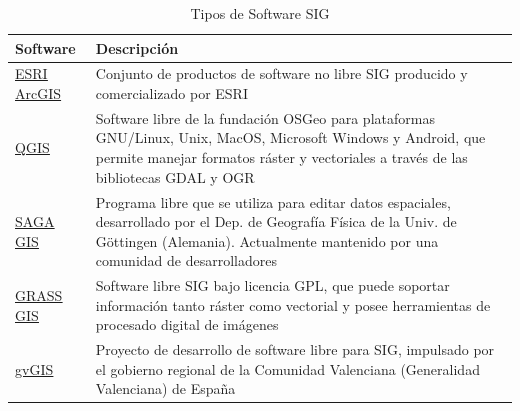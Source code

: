 \begin{table}[H]
	\centering
	\caption{Tipos de Software SIG}
	\label{softwaresSIG}
	\begin{tabular}[b]{|m{2.44cm}||m{8.69cm}|}
		\hline
		
		\cellcolor[HTML]{EFEFEF} \centering \textbf{Software} & \cellcolor[HTML]{EFEFEF} \textbf{Descripción} \\ \hline \hline
		
		
		\centering \href{https://www.arcgis.com/}{\underline{ESRI ArcGIS}} & Conjunto de productos de software no libre SIG producido y comercializado por ESRI \\ \hline
		
		\centering \href{https://qgis.org/es/site/}{\underline{QGIS}} & Software libre de la fundación OSGeo para plataformas GNU/Linux, Unix, MacOS, Microsoft Windows y Android, que permite manejar formatos ráster y vectoriales a través de las bibliotecas GDAL y OGR \\ \hline
		
		\centering \href{http://www.saga-gis.org/}{\underline{SAGA GIS}} & Programa libre que se utiliza para editar datos espaciales, desarrollado por el Dep. de Geografía Física de la Univ. de Göttingen (Alemania). Actualmente mantenido por una comunidad de desarrolladores \\ \hline
		
		
		\centering \href{https://grass.osgeo.org}{\underline{GRASS GIS}} & Software libre SIG bajo licencia GPL, que puede soportar información tanto ráster como vectorial y posee herramientas de procesado digital de imágenes \\ \hline
		
		\centering \href{http://www.gvsig.com/es}{\underline{gvGIS}} & Proyecto de desarrollo de software libre para SIG, impulsado por el gobierno regional de la Comunidad Valenciana (Generalidad Valenciana) de España \\ \hline
		
		
	\end{tabular}
\end{table}


